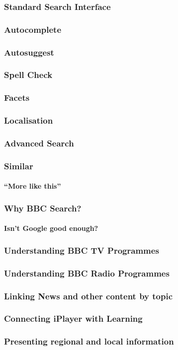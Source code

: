 \documentclass{beamer}
\begin{document}
\begin{frame}
  \frametitle{Standard Search Interface}
\end{frame}

\begin{frame}
  \frametitle{Autocomplete}
\end{frame}

\begin{frame}
  \frametitle{Autosuggest}
\end{frame}

\begin{frame}
  \frametitle{Spell Check}
\end{frame}

\begin{frame}
  \frametitle{Facets}
\end{frame}

\begin{frame}
  \frametitle{Localisation}
\end{frame}

\begin{frame}
  \frametitle{Advanced Search}
\end{frame}

\begin{frame}
  \frametitle{Similar}
  \framesubtitle{``More like this''}
\end{frame}

\begin{frame}
  \frametitle{Why BBC Search?}
  \framesubtitle{Isn't Google good enough?}
\end{frame}

\begin{frame}
  \frametitle{Understanding BBC TV Programmes}
\end{frame}

\begin{frame}
  \frametitle{Understanding BBC Radio Programmes}
\end{frame}

\begin{frame}
  \frametitle{Linking News and other content by topic}
\end{frame}

\begin{frame}
  \frametitle{Connecting iPlayer with Learning}
\end{frame}

\begin{frame}
  \frametitle{Presenting regional and local information}
\end{frame}
\end{document}
